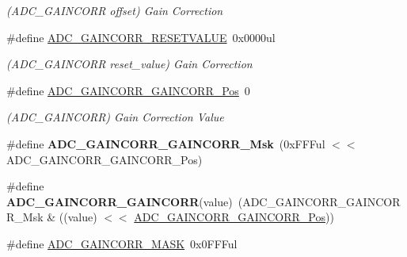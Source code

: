 \begin{DoxyCompactItemize}
\begin{DoxyCompactList}\small\item\em (A\+D\+C\+\_\+\+G\+A\+I\+N\+C\+O\+R\+R offset) Gain Correction \end{DoxyCompactList}\item 
\hypertarget{group___s_a_m_l21___a_d_c_gaa8f7dea45349053a7d05f0b61e9a867f}{}\#define \hyperlink{group___s_a_m_l21___a_d_c_gaa8f7dea45349053a7d05f0b61e9a867f}{A\+D\+C\+\_\+\+G\+A\+I\+N\+C\+O\+R\+R\+\_\+\+R\+E\+S\+E\+T\+V\+A\+L\+U\+E}~0x0000ul\label{group___s_a_m_l21___a_d_c_gaa8f7dea45349053a7d05f0b61e9a867f}

\begin{DoxyCompactList}\small\item\em (A\+D\+C\+\_\+\+G\+A\+I\+N\+C\+O\+R\+R reset\+\_\+value) Gain Correction \end{DoxyCompactList}\item 
\hypertarget{group___s_a_m_l21___a_d_c_ga1d8e6acd56583b4ba138c3493f455467}{}\#define \hyperlink{group___s_a_m_l21___a_d_c_ga1d8e6acd56583b4ba138c3493f455467}{A\+D\+C\+\_\+\+G\+A\+I\+N\+C\+O\+R\+R\+\_\+\+G\+A\+I\+N\+C\+O\+R\+R\+\_\+\+Pos}~0\label{group___s_a_m_l21___a_d_c_ga1d8e6acd56583b4ba138c3493f455467}

\begin{DoxyCompactList}\small\item\em (A\+D\+C\+\_\+\+G\+A\+I\+N\+C\+O\+R\+R) Gain Correction Value \end{DoxyCompactList}\item 
\hypertarget{group___s_a_m_l21___a_d_c_ga93a9527090e3c7a76f6c650d66865503}{}\#define {\bfseries A\+D\+C\+\_\+\+G\+A\+I\+N\+C\+O\+R\+R\+\_\+\+G\+A\+I\+N\+C\+O\+R\+R\+\_\+\+Msk}~(0x\+F\+F\+Ful $<$$<$ A\+D\+C\+\_\+\+G\+A\+I\+N\+C\+O\+R\+R\+\_\+\+G\+A\+I\+N\+C\+O\+R\+R\+\_\+\+Pos)\label{group___s_a_m_l21___a_d_c_ga93a9527090e3c7a76f6c650d66865503}

\item 
\hypertarget{group___s_a_m_l21___a_d_c_gab7af6ebc62d354f8efafba4f4313dfb8}{}\#define {\bfseries A\+D\+C\+\_\+\+G\+A\+I\+N\+C\+O\+R\+R\+\_\+\+G\+A\+I\+N\+C\+O\+R\+R}(value)~(A\+D\+C\+\_\+\+G\+A\+I\+N\+C\+O\+R\+R\+\_\+\+G\+A\+I\+N\+C\+O\+R\+R\+\_\+\+Msk \& ((value) $<$$<$ \hyperlink{group___s_a_m_l21___a_d_c_ga1d8e6acd56583b4ba138c3493f455467}{A\+D\+C\+\_\+\+G\+A\+I\+N\+C\+O\+R\+R\+\_\+\+G\+A\+I\+N\+C\+O\+R\+R\+\_\+\+Pos}))\label{group___s_a_m_l21___a_d_c_gab7af6ebc62d354f8efafba4f4313dfb8}

\item 
\hypertarget{group___s_a_m_l21___a_d_c_ga952f9f90ebf26fde618e26e5cd400223}{}\#define \hyperlink{group___s_a_m_l21___a_d_c_ga952f9f90ebf26fde618e26e5cd400223}{A\+D\+C\+\_\+\+G\+A\+I\+N\+C\+O\+R\+R\+\_\+\+M\+A\+S\+K}~0x0\+F\+F\+Ful\label{group___s_a_m_l21___a_d_c_ga952f9f90ebf26fde618e26e5cd400223}


\end{DoxyCompactItemize}
